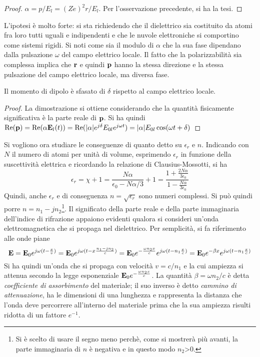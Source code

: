 \begin{proof}
$\alpha=p/E_l=(Ze)^2r/E_l$. Per l'osservazione precedente, si ha la tesi.
\end{proof}
L'ipotesi è molto forte: si sta richiedendo che il dielettrico sia costituito da atomi fra loro tutti uguali e
indipendenti e che le nuvole elettroniche si comportino come sistemi rigidi.
Si noti come sia il modulo di $\alpha$ che la sua fase dipendano dalla pulsazione $\omega$ del campo elettrico locale.
Il fatto che la polarizzabilità sia complessa implica che $\vb{r}$ e quindi $\vb{p}$ hanno la stessa direzione e la stessa
pulsazione del campo elettrico locale, ma diversa fase.
\begin{obs}
Il momento di dipolo è sfasato di $\delta$ rispetto al campo elettrico locale.
\end{obs}
\begin{proof}
    La dimostrazione si ottiene considerando che la quantità fisicamente significativa è la parte reale di $\vb{p}$.
    Si ha quindi $\Re(\vb{p})=\Re(\alpha \vb{E}_l(t))=\Re(\abs{\alpha}e^{j\delta} E_{0l}e^{j\omega t})=\abs{\alpha}E_{0l}\cos(\omega t+\delta)$
\end{proof}

Si vogliono ora studiare le conseguenze di quanto detto su $\epsilon_r$ e $n$. Indicando con $N$ il numero di atomi per unità di
volume, esprimendo $\epsilon_r$ in funzione della suscettività elettrica e ricordando la relazione di Clausius-Mossotti, si ha
\[
    \epsilon_r=\chi+1=\frac{N\alpha}{\epsilon_0-N\alpha/3}+1=\frac{1+\frac{2N\alpha}{3\epsilon_0}}{1-\frac{N\alpha}{3\epsilon_0}}
\]
Quindi, anche $\epsilon_r$ e di conseguenza $n=\sqrt{\epsilon_r}$ sono numeri complessi.
Si può quindi porre $n=n_1-jn_2$\footnote{Si è scelto di usare il segno meno perchè, come si mostrerà più avanti,
la parte immaginaria di $n$ è negativa e in questo modo $n_2$>0.}.
Il significato della parte reale e della parte immaginaria dell'indice di rifrazione
appaiono evidenti qualora si consideri un'onda elettromagnetica che si propaga nel dielettrico. Per semplicità, si fa
riferimento alle onde piane
\[
    \vb{E}=\vb{E}_0e^{j\omega(t-\frac{x}{v})}=\vb{E}_0e^{j\omega(t-x\frac{n_1-jn_2}{c})}=
    \vb{E}_0e^{-\frac{\omega n_2 x}{c}}e^{j\omega(t-n_1\frac{x}{c})}=
    \vb{E}_0e^{-\beta x}e^{j\omega(t-n_1\frac{x}{c})}
\]
Si ha quindi un'onda che si propaga con velocità $v=c/n_1$ e la cui ampiezza si attenua secondo la legge
esponenziale $\vb{E}_0 e^{-\frac{\omega n_2 x}{c}}$. La quantità $\beta=\omega n_2/c$ è detta
\textit{coefficiente di assorbimento} del materiale; il suo inverso è detto \textit{cammino di attenuazione},
ha le dimensioni di una lunghezza e rappresenta la distanza che l'onda deve percorrere all'interno del
materiale prima che la sua ampiezza risulti ridotta di un fattore $e^{-1}$.

